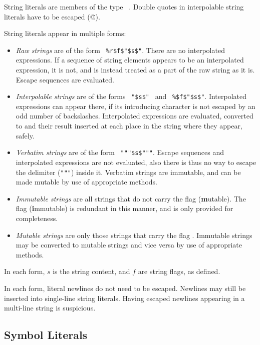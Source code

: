 String literals are members of the type ~\lstinline@String@. Double quotes in interpolable string literals have to be escaped (\lstinline@\"@).

String literals appear in multiple forms:
\begin{itemize}
  \item {\em Raw strings} are of the form ~\lstinline!%r$f$"$s$"!. There are no interpolated expressions. If a sequence of string elements appears to be an interpolated expression, it is not, and is instead treated as a part of the raw string as it is. Escape sequences are evaluated. 
  \item {\em Interpolable strings} are of the forms ~\lstinline!"$s$"!~ and ~\lstinline!%$f$"$s$"!. Interpolated expressions can appear there, if its introducing character is not escaped by an odd number of backslashes. Interpolated expressions are evaluated, converted to  and their result inserted at each place in the string where they appear, safely. 
  \item {\em Verbatim strings} are of the form ~\lstinline!"""$s$"""!. Escape sequences and interpolated expressions are not evaluated, also there is thus no way to escape the delimiter (\lstinline!"""!) inside it. Verbatim strings are immutable, and can be made mutable by use of appropriate methods. 
  \item {\em Immutable strings} are all strings that do not carry the flag  (\textbf{m}utable). The flag  (\textbf{i}mmutable) is redundant in this manner, and is only provided for completeness. 
  \item {\em Mutable strings} are only those strings that carry the flag . Immutable strings may be converted to mutable strings and vice versa by use of appropriate methods. 
\end{itemize}

In each form, $s$ is the string content, and $f$ are string flags, as defined. 

In each form, literal newlines do not need to be escaped. Newlines may still be inserted into single-line string literals. Having escaped newlines appearing in a multi-line string is suspicious. 





\subsection{Symbol Literals}
\label{sec:symbolliterals}

